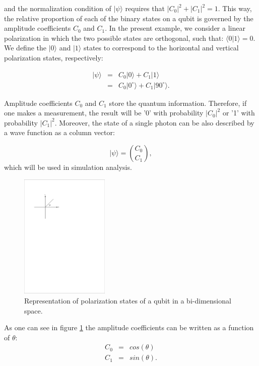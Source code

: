 and the normalization condition of $|\psi\rangle$ requires that $|C_0|^2+|C_1|^2=1$. This way, the relative proportion of each of the binary states on a qubit is governed by the amplitude coefficients $C_0$ and $C_1$. In the present example, we consider a linear polarization in which the two possible states are orthogonal, such that: $\langle 0|1 \rangle=0$. We define the $|0\rangle$ and $|1\rangle$ states to correspond to the horizontal and vertical polarization states, respectively:

\begin{eqnarray}
  |\psi\rangle &=& C_0 |0\rangle+C_1 |1\rangle \\
             &=& C_0 |0^{\circ}\rangle + C_1 |90^{\circ}\rangle .
\end{eqnarray}

Amplitude coefficients $C_0$ and $C_1$ store the quantum information. Therefore, if one makes a measurement, the result will be '0' with probability $|C_0|^2$ or '1' with probability $|C_1|^2$.
Moreover, the state of a single photon can be also described by a wave function as a column vector:

\begin{equation}\label{eq:wavefvector}
  |\psi\rangle = \binom{C_0}{C_1},
\end{equation}
which will be used in simulation analysis.

\begin{figure}[h]
    \centering
        \includegraphics[clip, trim=3cm 20cm 12cm 3cm, height=6cm]{./sdf/quantum_random_number_generator/figures/axis_states.pdf}
    \caption{Representation of polarization states of a qubit in a bi-dimensional space.}\label{fig:stateaxis}
\end{figure}

As one can see in figure \ref{fig:stateaxis} the amplitude coefficients can be written as a function of $\theta$:
\begin{eqnarray}
  C_0 &=& cos(\theta) \\
  C_1 &=& sin(\theta).
\end{eqnarray}


